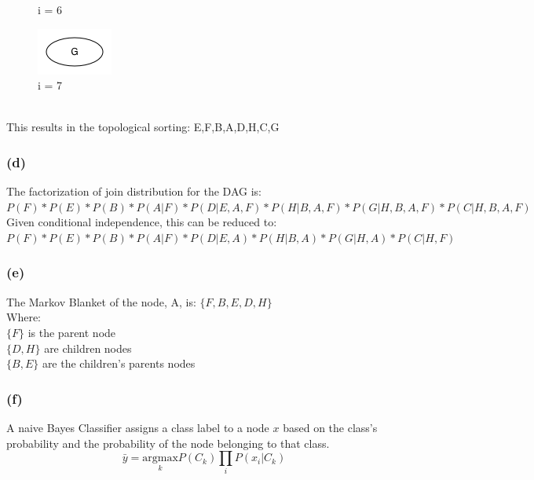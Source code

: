 \documentclass[11pt,a4paper]{article}
\begin{document}
\begin{figure}[h]
\begin{minipage}[t]{4 cm}
		\caption{i = 6}
  	\end{minipage}
  	\begin{minipage}[t]{4 cm}
		\includegraphics[width=\linewidth]{101c7}
		\caption{i = 7}
  	\end{minipage}
  \end{figure}\\
  This results in the topological sorting: E,F,B,A,D,H,C,G
  \newpage
  \subsubsection*{(d)} The factorization of join distribution for the DAG is:\\
  $P(F) * P(E) * P(B) * P(A|F) * P(D|E,A,F) * P(H|B,A,F) * P(G|H,B,A,F) * P(C|H,B,A,F)$\\
  Given conditional independence, this can be reduced to:\\
  $P(F) * P(E) * P(B) * P(A|F) * P(D|E,A) * P(H|B,A) * P(G|H,A) * P(C|H,F)$
  \subsubsection*{(e)} The Markov Blanket of the node, A, is: $\{F,B,E,D,H\}$\\
  Where:\\
  $\{F\}$ is the parent node\\
  $\{D,H\}$ are children nodes\\
  $\{B,E\}$ are the children's parents nodes
  \subsubsection*{(f)} A naive Bayes Classifier assigns a class label to a node $x$ based on the class's probability and the probability of the node belonging to that class.\\
  \begin{equation}
  	\bar{y} = \underset{k}{\text{argmax}} P(C_{k})\prod_{i}P(x_{i}|C_{k})
  \end{equation}
  
\end{document}
